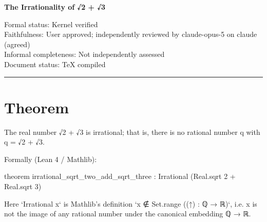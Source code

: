 \documentclass[11pt]{article}
\begin{document}
\begin{center}
{\LARGE\color{HardyBlue}\bfseries The Irrationality of √2 + √3\par}
\vspace{1em}
Formal status: Kernel verified\\
Faithfulness: User approved; independently reviewed by claude-opus-5 on claude (agreed)\\
Informal completeness: Not independently assessed\\
Document status: TeX compiled
\end{center}

\hrule
\vspace{1em}

\section*{Theorem}
The real number √2 + √3 is irrational; that is, there is no rational number q with q = √2 + √3.

Formally (Lean 4 / Mathlib):

    theorem irrational\_sqrt\_two\_add\_sqrt\_three : Irrational (Real.sqrt 2 + Real.sqrt 3)

Here `Irrational x` is Mathlib's definition `x ∉ Set.range ((↑) : ℚ → ℝ)`, i.e. x is not the image of any rational number under the canonical embedding ℚ → ℝ.
\end{document}
